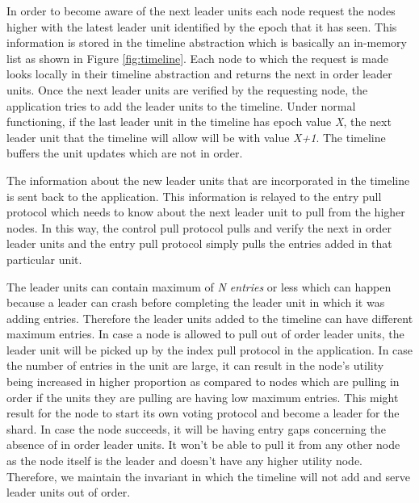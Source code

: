 \documentclass[12pt,a4paper,twoside,openright]{book}
\begin{document}
In order to become aware of the next leader units each node request the nodes higher with the latest leader unit identified by the epoch that it has seen. This information is stored in the timeline abstraction which is basically an in-memory list as shown in Figure \ref{fig:timeline}. Each node to which the request is made looks locally in their timeline abstraction and returns the next in order leader units. Once the next leader units are verified by the requesting node, the application tries to add the leader units to the timeline. Under normal functioning, if the last leader unit in the timeline has epoch value \textit{X}, the next leader unit that the timeline will allow will be with value \textit{X+1}. The timeline buffers the unit updates which are not in order.

The information about the new leader units that are incorporated in the timeline is sent back to the application. This information is relayed to the entry pull protocol which needs to know about the next leader unit to pull from the higher nodes. In this way, the control pull protocol pulls and verify the next in order leader units and the entry pull protocol simply pulls the entries added in that particular unit. 

\par The leader units can contain maximum of \textit{N entries} or less which can happen because a leader can crash before completing the leader unit in which it was adding entries. Therefore the leader units added to the timeline can have different maximum entries. In case a node is allowed to pull out of order leader units, the leader unit will be picked up by the index pull protocol in the application. In case the number of entries in the unit are large, it can result in the node's utility being increased in higher proportion as compared to nodes which are pulling in order if the units they are pulling are having low maximum entries. This might result for the node to start its own voting protocol and  become a leader for the shard. In case the node succeeds, it will be having entry gaps concerning the absence of in order leader units. It won't be able to pull it from any other node as the node itself is the leader and doesn't have any higher utility node. Therefore, we maintain the invariant in which the timeline will not add and serve leader units out of order. 
\end{document}
